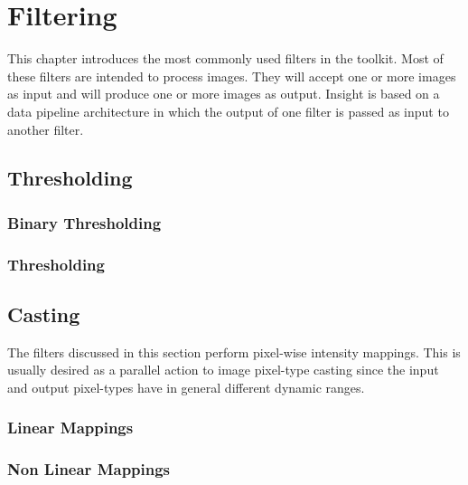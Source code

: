\chapter{Filtering}

This chapter introduces the most commonly used filters in the toolkit.  Most of
these filters are intended to process images. They will accept one or more
images as input and will produce one or more images as output. Insight is based
on a data pipeline architecture in which the output of one filter is passed as
input to another filter.


\section{Thresholding}
\label{sec:ThresholdingFiltering}

\subsection{Binary Thresholding}
\label{sec:BinaryThresholdingImageFilter}



\subsection{Thresholding}
\label{sec:ThresholdingImageFilter}





\section{Casting}
\label{sec:CastingImageFilters}

The filters discussed in this section perform pixel-wise intensity mappings.
This is usually desired as a parallel action to image pixel-type casting since
the input and output pixel-types have in general different dynamic ranges.

\subsection{Linear Mappings}
\label{sec:IntensityLinearMapping}



\subsection{Non Linear Mappings}
\label{sec:IntensityNonLinearMapping}

